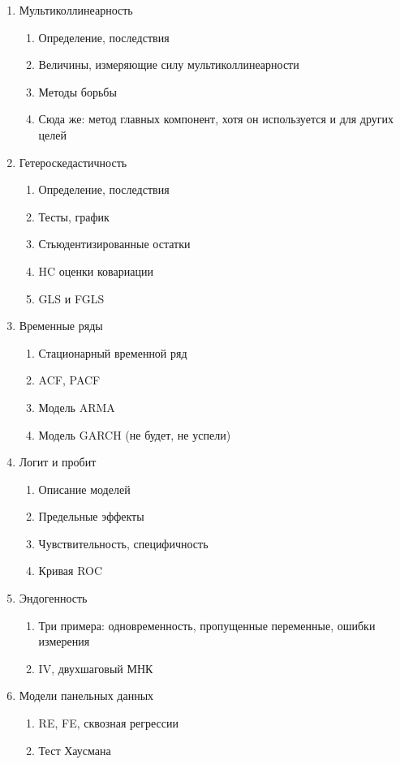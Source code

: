 \documentclass[12pt, a4paper]{article}
\begin{document}
\begin{enumerate}
\item Мультиколлинеарность
\begin{enumerate}
\item Определение, последствия
\item Величины, измеряющие силу мультиколлинеарности
\item Методы борьбы
\item Сюда же: метод главных компонент, хотя он используется и для других целей
\end{enumerate}


\item Гетероскедастичность
\begin{enumerate}
\item Определение, последствия
\item Тесты, график
\item Стьюдентизированные остатки
\item HC оценки ковариации
\item GLS и FGLS
\end{enumerate}

\item Временные ряды
\begin{enumerate}
\item Стационарный временной ряд
\item ACF, PACF
\item Модель ARMA
\item Модель GARCH (не будет, не успели)
\end{enumerate}


\item Логит и пробит
\begin{enumerate}
\item Описание моделей
\item Предельные эффекты
\item Чувствительность, специфичность
\item Кривая ROC
\end{enumerate}

\item Эндогенность
\begin{enumerate}
\item Три примера: одновременность, пропущенные переменные, ошибки измерения
\item IV, двухшаговый МНК
\end{enumerate}


\item Модели панельных данных
\begin{enumerate}
\item  RE, FE, сквозная регрессии
\item  Тест Хаусмана
\end{enumerate}


\end{enumerate}
\end{document}
